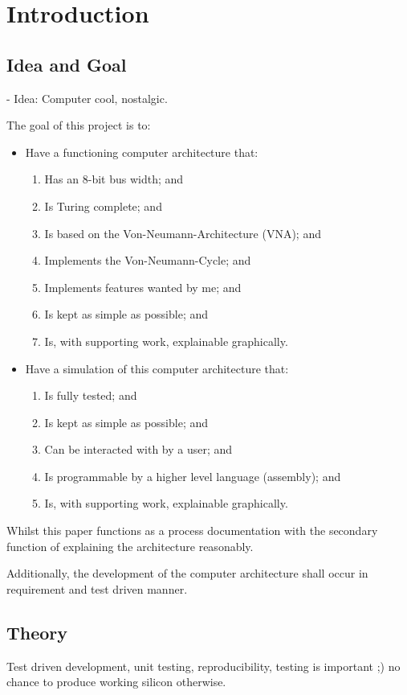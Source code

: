 \chapter{Introduction}

\section{Idea and Goal}
- Idea: Computer cool, nostalgic. 

The goal of this project is to: 
\begin{itemize}
  \item Have a functioning computer architecture that:
 \begin{enumerate}
    \item Has an 8-bit bus width; and
    \item Is Turing complete; and
    \item Is based on the Von-Neumann-Architecture (VNA); and
    \item Implements the Von-Neumann-Cycle; and
    \item Implements features wanted by me; and  
    \item Is kept as simple as possible; and
    \item Is, with supporting work, explainable graphically.
  \end{enumerate}
  \item Have a simulation of this computer architecture that: 
  \begin{enumerate}
    \item Is fully tested; and
    \item Is kept as simple as possible; and
    \item Can be interacted with by a user; and
    \item Is programmable by a higher level language (assembly); and
    \item Is, with supporting work, explainable graphically.
  \end{enumerate}
\end{itemize}

Whilst this paper functions as a process documentation with the secondary function of explaining the architecture reasonably.
  
Additionally, the development of the computer architecture shall occur in requirement and test driven manner. 

\section{Theory}
Test driven development, unit testing, reproducibility, testing is important ;) no chance to produce working silicon otherwise.

